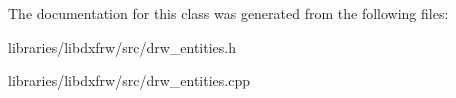 The documentation for this class was generated from the following files\-:\begin{DoxyCompactItemize}
\item 
libraries/libdxfrw/src/drw\-\_\-entities.\-h\item 
libraries/libdxfrw/src/drw\-\_\-entities.\-cpp\end{DoxyCompactItemize}
